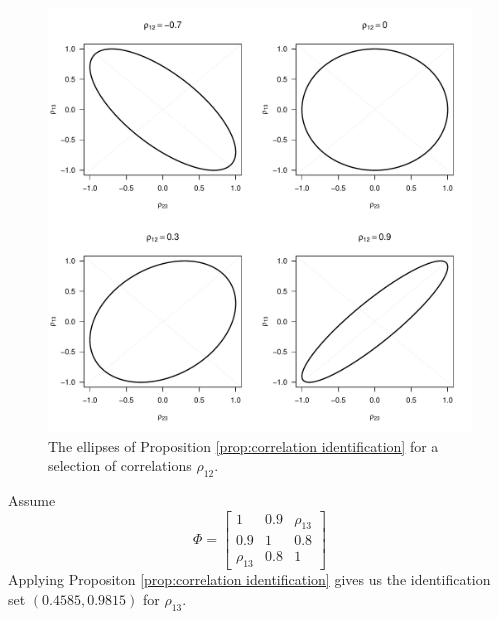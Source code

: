\begin{figure}
\noindent \begin{centering}
\includegraphics[scale=0.4]{chunks/rho}
\par\end{centering}
\caption{The ellipses of Proposition \ref{prop:correlation identification}
for a selection of correlations $\rho_{12}$.}
\end{figure}
%
\begin{example}
 Assume 
\[
\Phi=\left[\begin{array}{ccc}
1 & 0.9 & \rho_{13}\\
0.9 & 1 & 0.8\\
\rho_{13} & 0.8 & 1
\end{array}\right]
\]
Applying Propositon \ref{prop:correlation identification} gives us
the identification set $(0.4585,0.9815)$ for $\rho_{13}$.
\end{example}


